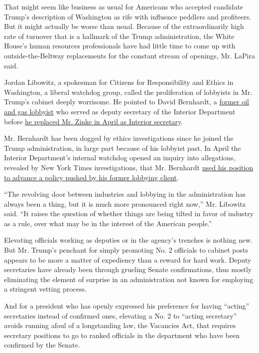 That might seem like business as usual for Americans who accepted
candidate Trump's description of Washington as rife with influence
peddlers and profiteers. But it might actually be worse than usual.
Because of the extraordinarily high rate of turnover that is a hallmark
of the Trump administration, the White House's human resources
professionals have had little time to come up with outside-the-Beltway
replacements for the constant stream of openings, Mr. LaPira said.

Jordan Libowitz, a spokesman for Citizens for Responsibility and Ethics
in Washington, a liberal watchdog group, called the proliferation of
lobbyists in Mr. Trump's cabinet deeply worrisome. He pointed to David
Bernhardt, a
\href{https://www.nytimes.com/2019/03/26/us/politics/endangered-species-david-bernhardt.html}{former
oil and gas lobbyist} who served as deputy secretary of the Interior
Department before
\href{https://www.nytimes.com/2019/04/11/climate/bernhardt-interior-senate-confirmation.html}{he
replaced Mr. Zinke in April as Interior secretary}.

Mr. Bernhardt has been dogged by ethics investigations since he joined
the Trump administration, in large part because of his lobbyist past. In
April the Interior Department's internal watchdog opened an inquiry into
allegations, revealed by New York Times investigations, that Mr.
Bernhardt
\href{https://www.nytimes.com/2019/02/12/climate/david-bernhardt-endangered-species.html?module=inline}{used
his position to advance a policy pushed by his former lobbying client}.

``The revolving door between industries and lobbying in the
administration has always been a thing, but it is much more pronounced
right now,'' Mr. Libowitz said. ``It raises the question of whether
things are being tilted in favor of industry as a rule, over what may be
in the interest of the American people.''

Elevating officials working as deputies or in the agency's trenches is
nothing new. But Mr. Trump's penchant for simply promoting No. 2
officials to cabinet posts appears to be more a matter of expediency
than a reward for hard work. Deputy secretaries have already been
through grueling Senate confirmations, thus mostly eliminating the
element of surprise in an administration not known for employing a
stringent vetting process.

And for a president who has openly expressed his preference for having
``acting'' secretaries instead of confirmed ones, elevating a No. 2 to
``acting secretary'' avoids running afoul of a longstanding law, the
Vacancies Act, that requires secretary positions to go to ranked
officials in the department who have been confirmed by the Senate.

